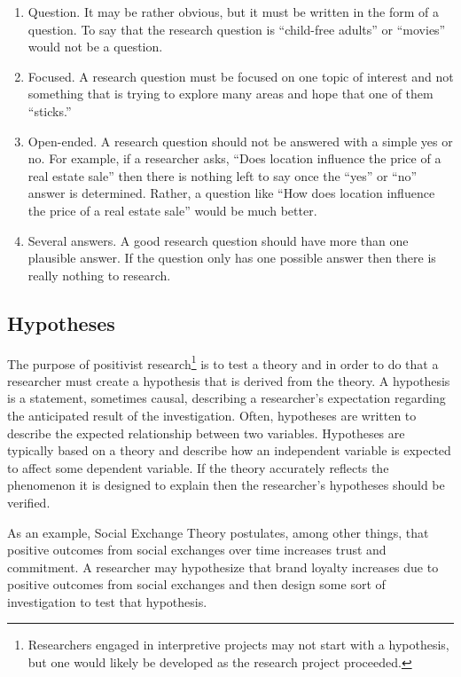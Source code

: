\begin{enumerate}
	\item Question. It may be rather obvious, but it must be written in the form of a question. To say that the research question is ``child-free adults'' or ``movies'' would not be a question. 
	\item Focused. A research question must be focused on one topic of interest and not something that is trying to explore many areas and hope that one of them ``sticks.''
	\item Open-ended. A research question should not be answered with a simple yes or no. For example, if a researcher asks, ``Does location influence the price of a real estate sale'' then there is nothing left to say once the ``yes'' or ``no'' answer is determined. Rather, a question like ``How does location influence the price of a real estate sale'' would be much better.
	\item Several answers. A good research question should have more than one plausible answer. If the question only has one possible answer then there is really nothing to research.
\end{enumerate}

\subsection{Hypotheses}

The purpose of positivist research\footnote{Researchers engaged in interpretive projects may not start with a hypothesis, but one would likely be developed as the research project proceeded.} is to test a theory and in order to do that a researcher must create a hypothesis that is derived from the theory. A hypothesis is a statement, sometimes causal, describing a researcher's expectation regarding the anticipated result of the investigation. Often, hypotheses are written to describe the expected relationship between two variables. Hypotheses are typically based on a theory and describe how an independent variable is expected to affect some dependent variable. If the theory accurately reflects the phenomenon it is designed to explain then the researcher's hypotheses should be verified.

As an example, Social Exchange Theory postulates, among other things, that positive outcomes from social exchanges over time increases trust and commitment\cite{lambe2001social}. A researcher may hypothesize that brand loyalty increases due to positive outcomes from social exchanges and then design some sort of investigation to test that hypothesis.

